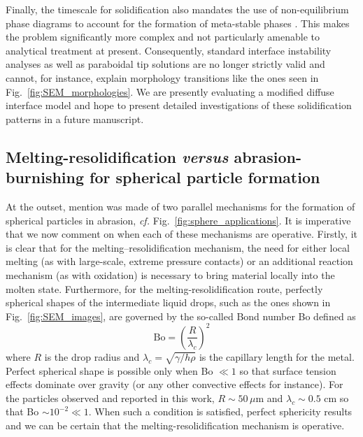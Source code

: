 \documentclass[11pt]{article}
\begin{document}
Finally, the timescale for solidification also mandates the use of non-equilibrium phase diagrams to account for the formation of meta-stable phases \cite{levi1982heat, galenko1997local}. This makes the problem significantly more complex and not particularly amenable to analytical treatment at present. Consequently, standard interface instability analyses \cite{mullins1964stability, ben1984pattern, alexandrov2021review} as well as paraboidal tip solutions \cite{ivantsov1988temperature} are no longer strictly valid and cannot, for instance, explain morphology transitions like the ones seen in Fig.~\ref{fig:SEM_morphologies}. We are presently evaluating a modified diffuse interface model and hope to present detailed investigations of these solidification patterns in a future manuscript. 

\subsection{Melting-resolidification \emph{versus} abrasion-burnishing for spherical particle formation}

At the outset, mention was made of two parallel mechanisms for the formation of spherical particles in abrasion, \emph{cf.} Fig.~\ref{fig:sphere_applications}. It is imperative that we now comment on when each of these mechanisms are operative. Firstly, it is clear that for the melting--resolidification mechanism, the need for either local melting (as with large-scale, extreme pressure contacts) or an additional reaction mechanism (as with oxidation) is necessary to bring material locally into the molten state. Furthermore, for the melting-resolidification route, perfectly spherical shapes of the intermediate liquid drops, such as the ones shown in Fig.~\ref{fig:SEM_images}, are governed by the so-called Bond number Bo defined as
\begin{equation}
  \text{Bo} = \left(\frac{R}{\lambda_c}\right)^2
\end{equation}
where $R$ is the drop radius and $\lambda_c = \sqrt{\gamma/h\rho}$ is the capillary length for the metal. Perfect spherical shape is possible only when Bo $\ll 1$ so that surface tension effects dominate over gravity (or any other convective effects for instance). For the particles observed and reported in this work, $R \sim 50\,\mu$m and $\lambda_c \sim 0.5$ cm so that Bo $\sim 10^{-2} \ll 1$. When such a condition is satisfied, perfect sphericity results and we can be certain that the melting-resolidification mechanism is operative.  
\end{document}
